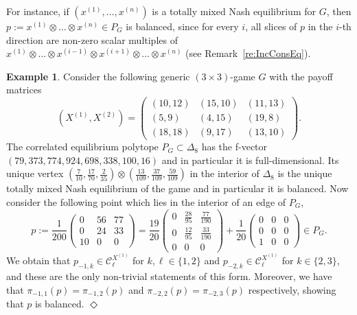 \documentclass[11pt]{amsart}
\theoremstyle{definition}
\newtheorem{example}[theorem]{Example}
\numberwithin{subcase}{case}
\newcommand*{\QEDA}{\hfill\ensuremath{\Diamond}}
\begin{document}
For instance, if $(x^{(1)},\dots,x^{(n)})$ is a totally mixed Nash
equilibrium for $G$, then $p:=x^{(1)} \otimes \dots \otimes x^{(n)} \in
P_G$ is balanced, since for every $i$, all slices of $p$ in the $i$-th
direction are non-zero scalar multiples of $x^{(1)} \otimes \dots \otimes
x^{(i-1)} \otimes x^{(i+1)} \otimes \dots \otimes x^{(n)}$ (see Remark~\ref{re:IncConsEq}).
\begin{example}\label{ex: 3x3 game balanced point}
Consider the following generic $(3 \times 3)$-game $G$ with the payoff matrices \[ (X^{(1)},X^{(2)})= \begin{pmatrix}
    (10,12) & (15,10) & (11,13) \\
    (5,9) & (4,15) & (19,8) \\
    (18,18) & (9,17) & (13,10)
\end{pmatrix}.  \]
The correlated equilibrium polytope $P_G \subset \Delta_8$ has the f-vector $(79, 373, 774, 924, 698, 338, 100, 16)$ and in particular it is full-dimensional. Its unique vertex $(\frac{7}{10}, \frac{17}{70}, \frac{2}{35}) \otimes (\frac{13}{109},\frac{37}{109}, \frac{59}{109})$ in the interior of $\Delta_8$ is the unique totally mixed Nash equilibrium of the game and in particular it is balanced. Now consider the following point which lies in the interior of an edge of $P_G$, \[p:=\frac{1}{200}\begin{pmatrix}
   0 & 56 & 77 \\
   0 & 24 & 33 \\
   10 & 0 & 0 
\end{pmatrix} = \frac{19}{20} \begin{pmatrix}
   0 & \frac{28}{95} & \frac{77}{190} \\
   0 & \frac{12}{95} & \frac{33}{190} \\
   0 & 0 & 0 
\end{pmatrix} + \frac{1}{20} \begin{pmatrix}
   0 & 0 & 0 \\
   0 & 0 & 0 \\
   1 & 0 & 0 
\end{pmatrix} \in P_G.  \]
We obtain that $p_{-1,k} \in \mathcal{C}^{X^{(1)}}_{\ell}$ for $k,\ell \in \{1,2\}$ and $p_{-2,k} \in \mathcal{C}^{X^{(1)}}_{\ell}$ for $k \in \{2,3\}$, and these are the only non-trivial statements of this form. Moreover, we have that $\pi_{-1,1}(p) = \pi_{-1,2}(p)$ and $\pi_{-2,2}(p) = \pi_{-2,3}(p)$ respectively, showing that $p$ is balanced. 
\QEDA
\end{example}
\end{document}
